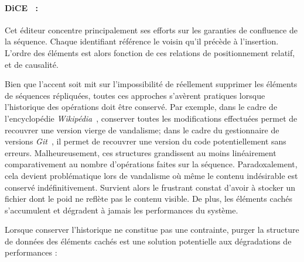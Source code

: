 \paragraph{DiCE~\cite{conway2014language} :} Cet éditeur concentre
principalement ses efforts sur les garanties de confluence de la
séquence. Chaque identifiant référence le voisin qu'il précède à
l'insertion. L'ordre des éléments est alors fonction de ces relations de
positionnement relatif, et de causalité.


Bien que l'accent soit mit sur l'impossibilité de réellement supprimer les
éléments de séquences répliquées, toutes ces approches s'avèrent pratiques
lorsque l'historique des opérations doit être conservé. Par exemple, dans le
cadre de l'encyclopédie \emph{Wikipédia}~\cite{wikipedia}, conserver toutes les
modifications effectuées permet de recouvrer une version vierge de vandalisme;
dans le cadre du gestionnaire de versions \emph{Git}~\cite{git}, il permet de
recouvrer une version du code potentiellement sans erreurs. Malheureusement, ces
structures grandissent au moins linéairement comparativement au nombre
d'opérations faites sur la séquence. Paradoxalement, cela devient problématique
lors de vandalisme où même le contenu indésirable est conservé
indéfinitivement. Survient alors le frustrant constat d'avoir à stocker un
fichier dont le poid ne reflète pas le contenu visible. De plus, les éléments
cachés s'accumulent et dégradent à jamais les performances du système.

Lorsque conserver l'historique ne constitue pas une contrainte, purger la
structure de données des éléments cachés est une solution potentielle aux
dégradations de performances :

